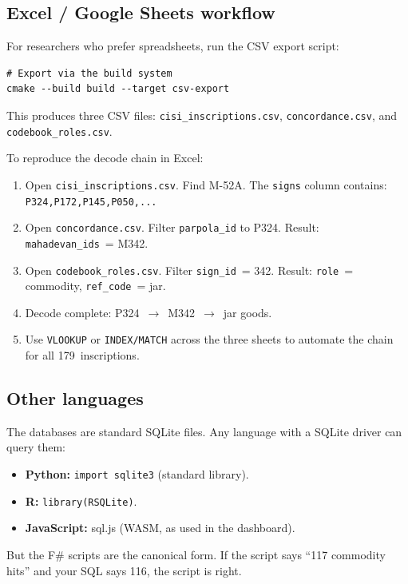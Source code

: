 \subsection{Excel / Google Sheets workflow}

For researchers who prefer spreadsheets, run the CSV export
script:

\begin{verbatim}
# Export via the build system
cmake --build build --target csv-export
\end{verbatim}

\noindent
This produces three CSV files:
\texttt{cisi\_inscriptions.csv},
\texttt{concordance.csv}, and
\texttt{codebook\_roles.csv}.

To reproduce the decode chain in Excel:

\begin{enumerate}
\item Open \texttt{cisi\_inscriptions.csv}. Find M-52A. The
  \texttt{signs} column contains:
  \texttt{P324,P172,P145,P050,...}
\item Open \texttt{concordance.csv}. Filter
  \texttt{parpola\_id} to P324.
  Result: \texttt{mahadevan\_ids}~= M342.
\item Open \texttt{codebook\_roles.csv}. Filter
  \texttt{sign\_id}~= 342.
  Result: \texttt{role}~= commodity,
  \texttt{ref\_code}~= jar.
\item Decode complete: P324~$\to$~M342~$\to$~jar goods.
\item Use \texttt{VLOOKUP} or \texttt{INDEX/MATCH} across the
  three sheets to automate the chain for all 179~inscriptions.
\end{enumerate}

\subsection{Other languages}

The databases are standard SQLite files. Any language with a
SQLite driver can query them:

\begin{itemize}
\item \textbf{Python:} \texttt{import sqlite3} (standard library).
\item \textbf{R:} \texttt{library(RSQLite)}.
\item \textbf{JavaScript:} sql.js (WASM, as used in the dashboard).
\end{itemize}

\noindent
But the F\# scripts are the canonical form. If the script says
``117 commodity hits'' and your SQL says 116, the script is right.

